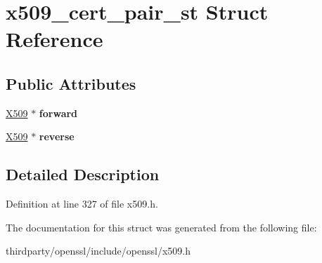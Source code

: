\hypertarget{structx509__cert__pair__st}{}\section{x509\+\_\+cert\+\_\+pair\+\_\+st Struct Reference}
\label{structx509__cert__pair__st}
\subsection*{Public Attributes}
\begin{DoxyCompactItemize}
\item 
\mbox{\label{structx509__cert__pair__st_a6187bc9b7943e8089be772b2657cfc65}} 
\hyperlink{structx509__st}{X509} $\ast$ {\bfseries forward}
\item 
\mbox{\label{structx509__cert__pair__st_acf854c09163ea3c9a79890aa13dee3bd}} 
\hyperlink{structx509__st}{X509} $\ast$ {\bfseries reverse}
\end{DoxyCompactItemize}


\subsection{Detailed Description}


Definition at line 327 of file x509.\+h.



The documentation for this struct was generated from the following file\+:\begin{DoxyCompactItemize}
\item 
thirdparty/openssl/include/openssl/x509.\+h\end{DoxyCompactItemize}
